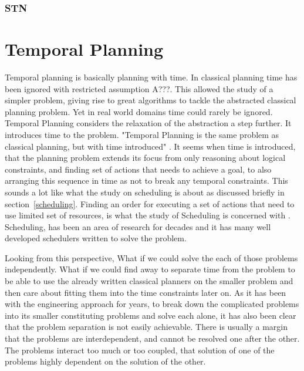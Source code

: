 \documentclass
[a4paper
,english
,parskip=half
,bibliography=totoc
]{scrreprt}
\begin{document}
    \subsection{STN}

\chapter{Temporal Planning} \label{temporal_planning}
    
    Temporal planning is basically planning with time. In classical planning time has been ignored with restricted assumption A???. This allowed the study of a simpler problem, giving rise to great algorithms to tackle the abstracted classical planning problem. Yet in real world domains time could rarely be ignored. Temporal Planning considers the relaxation of the abstraction a step further. It introduces time to the problem. "Temporal Planning is the same problem as classical planning, but with time introduced" \citep{HalseyLongFox2003}.
    It seems when time is introduced, that the planning problem extends its focus from only reasoning about logical constraints, and finding set of actions that needs to achieve a goal, to also arranging this sequence in time as not to break any temporal constraints. This sounds a lot like what the study on scheduling is about as discussed briefly in section~\ref{scheduling}. Finding an order for executing a set of actions that need to use limited set of resources, is what the study of Scheduling is concerned with \citep{automated_planning}. Scheduling, has been an area of research for decades and it has many well developed schedulers written to solve the problem.

    Looking from this perspective, What if we could solve the each of those problems independently. What if we could find away to separate time from the problem to be able to use the already written classical planners on the smaller problem and then care about fitting them into the time constraints later on. As it has been with the engineering approach for years, to break down the complicated problems into its smaller constituting problems and solve each alone, it has also been clear that the problem separation is not easily achievable. There is usually a margin that the problems are interdependent, and cannot be resolved one after the other. The problems interact too much or too coupled, that solution of one of the problems highly dependent on the solution of the other.
\end{document}
